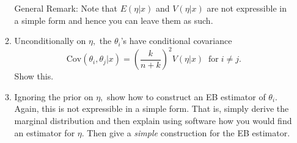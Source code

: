 \documentclass[11pt]{article}
\begin{document}
\begin{enumerate}
\begin{enumerate}
General Remark: Note that $E(\eta|x)$ and $V(\eta|x)$ are not expressible in a simple form and hence you can leave them as such. 
\item Unconditionally on $\eta,$ the $\theta_i$'s have conditional covariance 
$$\text{Cov}(\theta_i,\theta_j|x) = \left(\frac{k}{n+k}\right)^2V(\eta|x)\; \;\text{for} \; i\neq j.$$
Show this. 
\item Ignoring the prior on $\eta,$ show how to construct an EB estimator of $\theta_i.$ Again, this is not expressible in a simple form. That is, simply derive the marginal distribution and then explain using software how you would find an estimator for $\eta.$ Then give a \emph{simple} construction for the EB estimator. 
\end{enumerate}
%
%
%
%
%

\end{enumerate}
\end{document}
